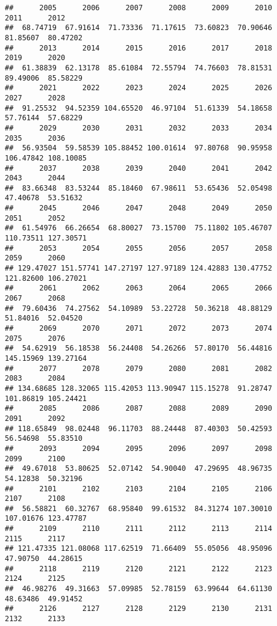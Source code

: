\documentclass[
]{article}
\begin{document}
\begin{verbatim}
##      2005      2006      2007      2008      2009      2010      2011      2012 
##  68.74719  67.91614  71.73336  71.17615  73.60823  70.90646  81.85607  80.47202 
##      2013      2014      2015      2016      2017      2018      2019      2020 
##  61.38839  62.13178  85.61084  72.55794  74.76603  78.81531  89.49006  85.58229 
##      2021      2022      2023      2024      2025      2026      2027      2028 
##  91.25532  94.52359 104.65520  46.97104  51.61339  54.18658  57.76144  57.68229 
##      2029      2030      2031      2032      2033      2034      2035      2036 
##  56.93504  59.58539 105.88452 100.01614  97.80768  90.95958 106.47842 108.10085 
##      2037      2038      2039      2040      2041      2042      2043      2044 
##  83.66348  83.53244  85.18460  67.98611  53.65436  52.05498  47.40678  53.51632 
##      2045      2046      2047      2048      2049      2050      2051      2052 
##  61.54976  66.26654  68.80027  73.15700  75.11802 105.46707 110.73511 127.30571 
##      2053      2054      2055      2056      2057      2058      2059      2060 
## 129.47027 151.57741 147.27197 127.97189 124.42883 130.47752 121.82600 106.27021 
##      2061      2062      2063      2064      2065      2066      2067      2068 
##  79.60436  74.27562  54.10989  53.22728  50.36218  48.88129  51.84016  52.04520 
##      2069      2070      2071      2072      2073      2074      2075      2076 
##  54.62919  56.18538  56.24408  54.26266  57.80170  56.44816 145.15969 139.27164 
##      2077      2078      2079      2080      2081      2082      2083      2084 
## 134.68685 128.32065 115.42053 113.90947 115.15278  91.28747 101.86819 105.24421 
##      2085      2086      2087      2088      2089      2090      2091      2092 
## 118.65849  98.02448  96.11703  88.24448  87.40303  50.42593  56.54698  55.83510 
##      2093      2094      2095      2096      2097      2098      2099      2100 
##  49.67018  53.80625  52.07142  54.90040  47.29695  48.96735  54.12838  50.32196 
##      2101      2102      2103      2104      2105      2106      2107      2108 
##  56.58821  60.32767  68.95840  99.61532  84.31274 107.30010 107.01676 123.47787 
##      2109      2110      2111      2112      2113      2114      2115      2117 
## 121.47335 121.08068 117.62519  71.66409  55.05056  48.95096  47.90750  44.28615 
##      2118      2119      2120      2121      2122      2123      2124      2125 
##  46.98276  49.31663  57.09985  52.78159  63.99644  64.61130  48.63486  49.91452 
##      2126      2127      2128      2129      2130      2131      2132      2133 

\end{verbatim}
\end{document}
